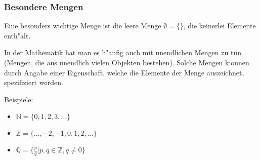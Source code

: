 \documentclass{beamer}
\begin{document}
\begin{frame}
  \frametitle{Besondere Mengen}
  Eine besonders wichtige Menge ist die leere Menge $\emptyset = \{\}$, die keinerlei
Elemente enth"alt.

In der Mathematik hat man es h"aufig auch mit unendlichen Mengen zu
tun (Mengen, die aus unendlich vielen Objekten bestehen).
Solche Mengen k:onnen durch Angabe einer Eigenschaft, welche die
Elemente der Menge auszeichnet, spezifiziert werden.

Beispiele:
\begin{itemize}
  \item $\mathbb{N}=\{0,1,2,3,\dots\}$
  \item $\mathbb{Z}=\{\dots,-2,-1,0,1,2,\dots\}$
  \item $\mathbb{Q}=\{\frac{p}{q}|p,q\in\mathbb{Z}, q\neq 0\}$
  
\end{itemize}
\end{frame}






\end{document}
